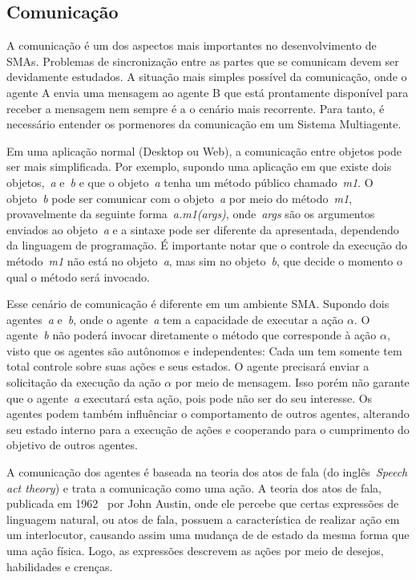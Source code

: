 \subsection{Comunicação}

A comunicação é um dos aspectos mais importantes no desenvolvimento de SMAs. Problemas de sincronização entre as partes que se comunicam devem ser devidamente estudados. A situação mais simples possível da comunicação, onde o agente A envia uma mensagem ao agente B que está prontamente disponível para receber a mensagem nem sempre é a o cenário mais recorrente. Para tanto, é necessário entender os pormenores da comunicação em um Sistema Multiagente.

Em uma aplicação normal (Desktop ou Web), a comunicação entre objetos pode ser mais simplificada. Por exemplo, supondo uma aplicação em que existe dois objetos,~\emph{a} e~\emph{b} e que o objeto~\emph{a} tenha um método público chamado~\emph{m1}. O objeto~\emph{b} pode ser comunicar com o objeto~\emph{a} por meio do método~\emph{m1}, provavelmente da seguinte forma~\emph{a.m1(args)}, onde~\emph{args} são os argumentos enviados ao objeto~\emph{a} e a sintaxe pode ser diferente da apresentada, dependendo da linguagem de programação. É importante notar que o controle da execução do método~\emph{m1} não está no objeto~\emph{a}, mas sim no objeto~\emph{b}, que decide o momento o qual o método será invocado.

Esse cenário de comunicação é diferente em um ambiente SMA. Supondo dois agentes~\emph{a} e~\emph{b}, onde o agente~\emph{a} tem a capacidade de executar a ação $\alpha$. O agente~\emph{b} não poderá invocar diretamente o método que corresponde à ação $\alpha$, visto que os agentes são autônomos e independentes: Cada um tem somente tem total controle sobre suas ações e seus estados. O agente precisará enviar a solicitação da execução da ação $\alpha$ por meio de mensagem. Isso porém não garante que o agente~\emph{a} executará esta ação, pois pode não ser do seu interesse. Os agentes podem também influênciar o comportamento de outros agentes, alterando seu estado interno para a execução de ações e cooperando para o cumprimento do objetivo de outros agentes.

A comunicação dos agentes é baseada na teoria dos atos de fala (do inglês~\emph{Speech act theory}) e trata a comunicação como uma ação. A teoria dos atos de fala, publicada em 1962~\cite{austin62} por John Austin, onde ele percebe que certas expressões de linguagem natural, ou atos de fala, possuem a característica de realizar ação em um interlocutor, causando assim uma mudança de de estado da mesma forma que uma ação física. Logo, as expressões descrevem as ações por meio de desejos, habilidades e crenças.

